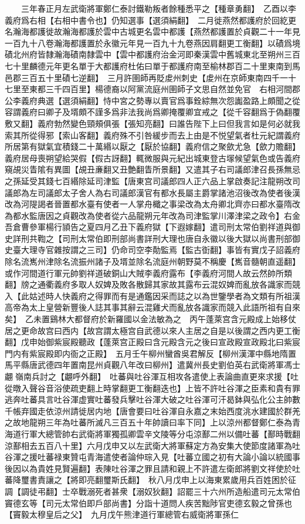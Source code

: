 　　三年春正月左武衛將軍鄭仁泰討鐵勒叛者餘種悉平之【種章勇翻】　乙酉以李義府爲右相【右相中書令也】仍知選事【選須絹翻】　二月徙燕然都護府於回紇更名瀚海都護徙故瀚海都護於雲中古城更名雲中都護【燕然都護置於貞觀二十一年見一百九十八卷瀚海都護置於永徽元年見一百九十九卷燕因肩翻更工衡翻】以磧爲境磧北州府皆隸瀚海磧南隸雲中【雲中都護府治金河即秦漢雲中舊城東北至朔州三百七十里麟德元年更名單于大都護府杜佑曰單于都護府南至榆林郡百二十里東南到馬邑郡三百五十里磧七逆翻】　三月許圉師再貶䖍州刺史【䖍州在京師東南四千一十七里至東都三千四百里】楊德裔以阿黨流庭州圉師子文思自然並免官　右相河間郡公李義府典選【選須絹翻】恃中宮之勢專以賣官爲事銓綜無次怨讟盈路上頗聞之從容謂義府曰卿子及壻頗不謹多爲非法我尚爲卿掩覆卿宜戒之【從千容翻爲于偽翻覆敷又翻】義府勃然變色頸頰俱張【張知亮翻】曰誰告陛下上曰但我言如是何必就我索其所從得邪【索山客翻】義府殊不引咎緩步而去上由是不悦望氣者杜元紀謂義府所居第有獄氣宜積錢二十萬緡以厭之【厭於協翻】義府信之聚歛尤急【歛力贍翻】義府居母喪朔望給哭假【假古訝翻】輒微服與元紀出城東登古塜候望氣色或告義府窺覘災眚隂有異圖【覘丑亷翻又丑艶翻眚所景翻】又遣其子右司議郎津召長孫無忌之孫延受其錢七百緡除延司津監【唐東宫司議郎四人正六品上掌啟奏記注龍朔改司議郎為左司議郎太子舍人為右司議郎漢官有都水長屬主爵掌諸池沼後改為使者後漢改為河隄謁者晉置都水臺有使者一人掌舟檝之事梁改為太舟卿北齊亦曰都水臺隋改為都水監唐因之貞觀改為使者從六品龍朔元年改為司津監掌川澤津梁之政令】右金吾倉曹參軍楊行頴告之夏四月乙丑下義府獄【下遐嫁翻】遣司刑太常伯劉祥道與御史詳刑共鞫之【司刑太常伯即刑部尚書詳刑大理也唐自永徽以後大獄以尚書刑部御史臺大理寺官雜按謂之三司】仍命司空李勣監焉【監古衘翻】事皆有實戊子詔義府除名流嶲州津除名流振州諸子及壻並除名流庭州朝野莫不稱慶【嶲音髓朝直遥翻】或作河間道行軍元帥劉祥道破銅山大賊李義府露布【李義府河間人故云然帥所類翻】牓之通衢義府多取人奴婢及敗各散歸其家故其露布云混奴婢而亂放各識家而競入【此姑述時人快義府之得罪而有是通鑑因采而誌之以為世鑒學者為文類有所祖漢高帝為太上皇營新豐後人誌其事其辭云混雞犬而亂放各識家而競入此語所祖有自來矣】　乙未置鷄林大都督府於新羅國以金法敏為之　丙午蓬萊宫含元殿成上始移仗居之更命故宫曰西内【故宫謂太極宫自武德以來人主居之自是以後謂之西内更工衡翻】戊申始御紫宸殿聽政【蓬萊宫正殿曰含元殿含元之後曰宣政殿宣政殿北曰紫宸門内有紫宸殿即内衙之正殿】　五月壬午柳州蠻酋吳君解反【柳州漢渾中縣地隋置馬平縣唐武德四年置南昆州貞觀八年改曰柳州】遣冀州長史劉伯英右武衛將軍馮士翽嶺南兵討之【翽呼外翻】　吐蕃與吐谷渾互相攻各遣使上表論曲直更來求援【吐從暾入聲谷音浴使疏吏翻上時掌翻更工衡翻迭也】上皆不許吐谷渾之臣素和貴有罪逃奔吐蕃具言吐谷渾虚實吐蕃發兵擊吐谷渾大破之吐谷渾可汗曷鉢與弘化公主帥數千帳弃國走依涼州請徙居内地【唐會要曰吐谷渾自永嘉之末始西度洮水建國於群羌之故地龍朔三年為吐蕃所滅凡三百五十年帥讀曰率下同】上以涼州都督鄭仁泰為青海道行軍大總管帥右武衛將軍獨孤卿雲辛文陵等分屯涼鄯二州以備吐蕃【鄯時戰翻涼鄯相去五百八十里】六月戊申又以左武衛大將軍蘇定方為安集大使節度諸軍為吐谷渾之援吐蕃禄東贊屯青海遣使者論仲琮入見【吐蕃立國之初有大論小論以統國事後因以為貴姓見賢遍翻】表陳吐谷渾之罪且請和親上不許遣左衛郎將劉文祥使於吐蕃降璽書責讓之【將即亮翻璽斯氏翻】　秋八月戊申上以海東累歲用兵百姓困於征調【調徒弔翻】士卒戰溺死者甚衆【溺奴狄翻】詔罷三十六州所造船遣司元太常伯竇德玄等【司元太常伯即戶部尚書】分詣十道問人疾苦黜陟官吏德玄毅之曾孫也【竇毅太穆皇后之父】　九月戊午熊津道行軍總管右威衛將軍孫仁